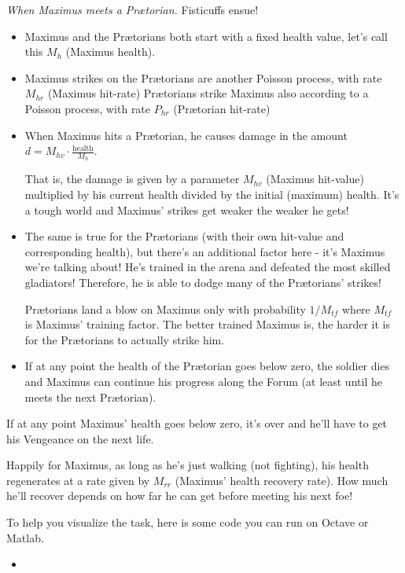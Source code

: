 \begin{redbox}
\emph{When Maximus meets a Pr{\ae}torian.}	
Fisticuffs ensue!

\begin{itemize}
\item Maximus and the Pr{\ae}torians both start with a fixed health value, let's call this $M_h$ (Maximus health).
\item Maximus strikes on the Pr{\ae}torians are another Poisson process, with rate $M_{hr}$ (Maximus hit-rate) Pr{\ae}torians strike Maximus also according to a Poisson process, with rate $P_{hr}$ (Pr{\ae}torian hit-rate)
\item When Maximus hits a Pr{\ae}torian, he causes damage in the amount $d=M_{hv} \cdot \frac{\text{health}}{M_h}$.

	That is, the damage is given by a parameter $M_{hv}$ (Maximus hit-value) multiplied by his current health divided by the initial (maximum) health. It's a tough world and Maximus' strikes get weaker the weaker he gets!
\item The same is true for the Pr{\ae}torians (with their own hit-value and corresponding health), but there's an additional factor here - it's Maximus we're talking about! He's trained in the arena and defeated the most skilled gladiators! Therefore, he is able to dodge many of the Pr{\ae}torians' strikes!

	Pr{\ae}torians land a blow on Maximus only with probability $1/M_{tf}$ where $M_{tf}$ is Maximus' training factor. The better trained Maximus is, the harder it is for the Pr{\ae}torians to actually strike him.
\item If at any point the health of the Pr{\ae}torian goes below zero, the soldier dies and Maximus can continue his progress along the Forum (at least until he meets the next Pr{\ae}torian).
\end{itemize}
\end{redbox}

If at any point Maximus' health goes below zero, it's over and he'll have to get his Vengeance on the next life.

Happily for Maximus, as long as he's just walking (not fighting), his health regenerates at a rate given by $M_{rr}$ (Maximus' health recovery rate). How much he'll recover depends on how far he can get before meeting his next foe! \\




\newpage
\begin{graybox}
To help you visualize the task, here is some code you can run on Octave or Matlab.
\begin{itemize}
	\item {}
\end{itemize}
\end{graybox}

